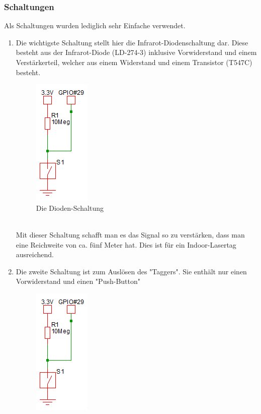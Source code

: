 \newpage
\subsubsection{Schaltungen}

Als Schaltungen wurden lediglich sehr Einfache verwendet. 
\begin{enumerate}
	\item Die wichtigste Schaltung stellt hier die Infrarot-Diodenschaltung dar. Diese besteht aus der Infrarot-Diode (LD-274-3) inklusive Vorwiderstand und einem Verstärkerteil, welcher aus einem Widerstand und einem Transistor (T547C) besteht.\\
	\begin{figure}[h]
		\centering
		\includegraphics[width=0.2 \textwidth]{./040-komponenten/010-hardware/button.png}
		\caption{Die Dioden-Schaltung}
		\label{fig:Bild2Hardware}
	\end{figure}\\
	Mit dieser Schaltung schafft man es das Signal so zu verstärken, dass man eine Reichweite von ca. fünf Meter hat. Dies ist für ein Indoor-Lasertag ausreichend.\\
	\item Die zweite Schaltung ist zum Auslösen des "Taggers". Sie enthält nur einen Vorwiderstand und einen "Push-Button"\\
	\begin{figure}[h]
		\centering
		\includegraphics[with=0.2 \textwidth]{./040-komponenten/010-hardware/button.png}

\end{figure}
\end{enumerate}
